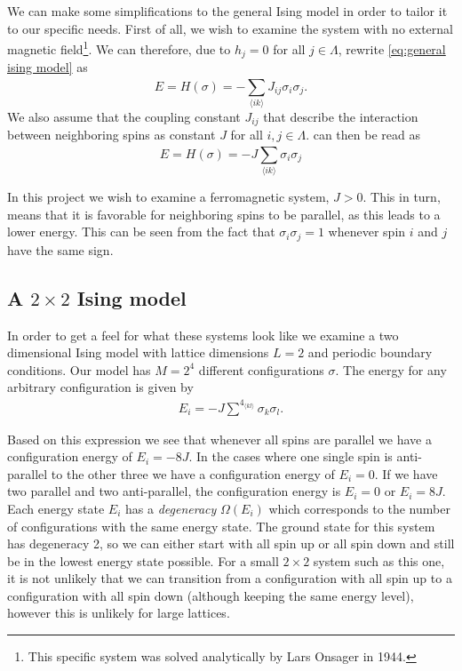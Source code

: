 We can make some simplifications to the general Ising model in order to tailor
it to our specific needs. First of all, we wish to examine the system with no
external magnetic field\footnote{This specific system was solved analytically
by Lars Onsager in 1944.}. We can therefore, due to $h_j = 0$ for all $j \in
\Lambda$, rewrite
\cref{eq:general ising model} as
\begin{equation}
  \label{eq:no magnetic ising}
  E = H(\sigma) = - \sum^{}_{\langle i k \rangle} J_{ij}\sigma_i\sigma_j.
\end{equation}
We also assume that the coupling constant $J_{ij}$ that describe the
interaction between neighboring spins as constant $J$ for all $i, j \in
\Lambda$.  can then be read as
\begin{equation}
  \label{eq:constant interaction ising}
  E = H(\sigma) = - J\sum^{}_{\langle i k \rangle} \sigma_i\sigma_j
\end{equation}

In this project we wish to examine a ferromagnetic system, $J > 0$. This in
turn, means that it is favorable for neighboring spins to be parallel, as this
leads to a lower energy. This can be seen from the fact that $\sigma_i \sigma_j
= 1$ whenever spin $i$ and $j$ have the same sign.

\subsection{A $2\times2$ Ising model}
\label{sub:a_2times2_ising_model}

In order to get a feel for what these systems look like we examine a two
dimensional Ising model with lattice dimensions $L = 2$ and periodic boundary
conditions. Our model has $M = 2^4$ different configurations $\sigma$. The
energy for any arbitrary configuration is given by
\begin{align*}
  \label{eq:abitrary energy}
  E_i = -J \sum^{4}\nolimits_{\langle kl \rangle} \sigma_k\sigma_l.
\end{align*}

Based on this expression we see that whenever all spins are parallel we have a
configuration energy of $E_i = -8J$. In the cases where one single spin is
anti-parallel to the other three we have a configuration energy of $E_i = 0$.
If we have two parallel and two anti-parallel, the configuration energy is $E_i
= 0$ or $E_i = 8J$. Each energy state $E_i$ has a \emph{degeneracy}
$\Omega(E_i)$ which corresponds to the number of configurations with the same
energy state. The ground state for this system has degeneracy 2, so we can
either start with all spin up or all spin down and still be in the lowest
energy state possible. For a small $2\times2$ system such as this one, it is
not unlikely that we can transition from a configuration with all spin up to a
configuration with all spin down (although keeping the same energy level),
however this is unlikely for large lattices.


